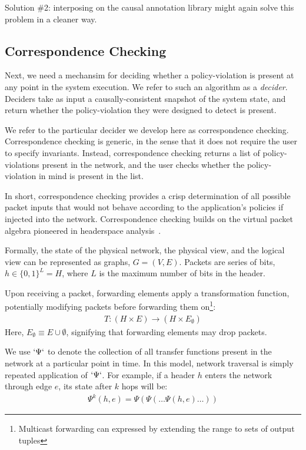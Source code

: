 Solution \#2: interposing on the causal annotation library might again solve this problem in a cleaner way.

\subsection{Correspondence Checking}

Next, we need a mechansim for deciding
whether a policy-violation is present at any point in the system execution.
We refer to such an algorithm as a {\em decider}. Deciders take as input a
causally-consistent snapshot of the system state, and return whether the
policy-violation they were designed to detect is present.

We refer to the particular decider we develop here as correspondence checking.
Correspondence checking is generic, in the sense that it does not require
the user to specify invariants. Instead, correspondence checking returns a list
of policy-violations present in the network, and the user checks whether the
policy-violation in mind is present in the list.

In short, correspondence checking provides a crisp determination of all possible packet inputs that
would not behave according to the application's policies if injected into the
network. Correspondence checking builds on the virtual packet algebra pioneered in headerspace
analysis~\cite{hsa}. 

Formally, the state of the physical network, the physical view, and the
logical view can be represented as graphs,
$G = (V, E)$. Packets are series of bits, $h \in \{0,1\}^L = H$,
where $L$ is the maximum number of bits in the header.

Upon receiving a packet,
forwarding elements apply a transformation function, potentially modifying
packets before forwarding them on\footnote{Multicast forwarding can expressed
by extending the range to sets of output tuples}:
\begin{align*}
T: (H \times E) \rightarrow (H \times E_{\emptyset})
\end{align*}
Here, $E_{\emptyset} \equiv E \cup \emptyset$, signifying that forwarding elements
may drop packets.

We use $`\Psi`$ to denote the collection of all transfer functions present in
the network at a particular point in time. In this model, network traversal is
simply repeated application of $`\Psi`$.
For example, if a header $h$ enters the network through edge
$e$, its state after $k$ hops will be:
\begin{align*}
\Psi^k(h,e) = \Psi(\Psi(\dots \Psi(h,e)\dots))
\end{align*}

